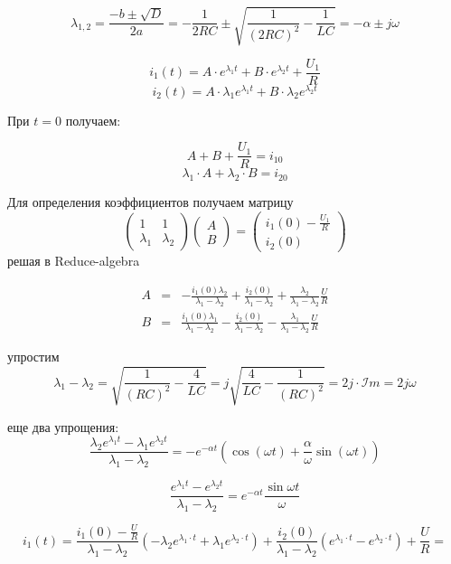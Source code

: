 \documentclass[a4paper,12pt]{article}
\begin{document}
$$
\lambda_{1,2} = \frac{-b \pm \sqrt{D}}{2a} = -\frac{1}{2RC} \pm \sqrt{\frac{1}{(2RC)^2}- \frac{1}{LC}}
= -\alpha \pm j\omega
$$

$$
i_1(t) = A\cdot e^{\lambda_1 t} + B\cdot e^{\lambda_2 t} + \frac{U_1}{R}
$$
$$
i_2(t) = A\cdot \lambda_1e^{\lambda_1 t} + B\cdot \lambda_2e^{\lambda_2 t}
$$



При $t=0$ получаем:

$$
A + B + \frac{U_1}{R} = i_{10}
$$
$$
\lambda_1 \cdot A + \lambda_2 \cdot B = i_{20}
$$



Для определения коэффициентов получаем матрицу
$$
\left(
\begin{array}{cc}
  1 & 1 \\[1.5mm] 
  \lambda_1 & \lambda_2 
\end{array}
\right)\left(
\begin{array}{c}
  A\\[1.5mm]
  B 
\end{array}  
\right)=\left(
\begin{array}{c}
	i_1(0) - \frac{U_1}{R}\\[1.5mm]
  i_2(0) 
\end{array}
\right)
$$
решая в Reduce-algebra

$$
\begin{array}{ccl}
	A&=&-\frac{i_1(0)\lambda_2}{\lambda_1-\lambda_2} + \frac{i_2(0)}{\lambda_1-\lambda_2} + \frac{\lambda_2}{\lambda_1-\lambda_2}\frac{U}{R}\\[1.5mm]
	B&=&\frac{i_1(0)\lambda_1}{\lambda_1-\lambda_2} - \frac{i_2(0)}{\lambda_1-\lambda_2} - \frac{\lambda_1}{\lambda_1-\lambda_2}\frac{U}{R}
\end{array}
$$

упростим 
$$
\lambda_1 - \lambda_2 = \sqrt{\frac{1}{(RC)^2} - \frac{4}{LC}} = j \sqrt{\frac{4}{LC} - \frac{1}{(RC)^2}} = 2j\cdot \mathcal{I}m = 2j\omega
$$




еще два упрощения:
$$
\frac{\lambda_2e^{\lambda_1t} - \lambda_1e^{\lambda_2t}}{\lambda_1-\lambda_2} = -e^{-\alpha t}
\left(\cos(\omega t) + \frac{\alpha}{\omega} \sin(\omega t)\right)
$$

$$
\frac{e^{\lambda_1t} - e^{\lambda_2t}}{\lambda_1-\lambda_2} = e^{-\alpha t}
\frac{\sin\omega t}{\omega}
$$


$$
i_1(t) = \frac{i_1(0) - \frac{U}{R}}{\lambda_1-\lambda_2} \left( -\lambda_2e^{\lambda_1 \cdot t}  + \lambda_1e^{\lambda_2 \cdot t} \right)
+\frac{i_2(0)}{\lambda_1 - \lambda_2} \left(e^{\lambda_1\cdot t} - e^{\lambda_2\cdot t}\right)  + \frac{U}{R}=
$$
\end{document}
